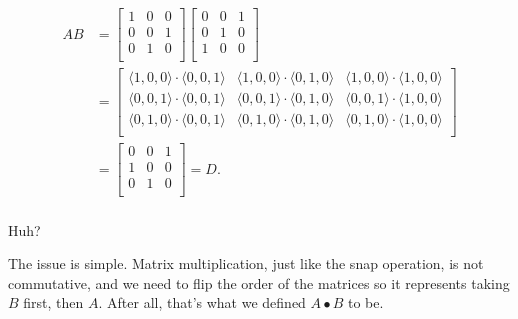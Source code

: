 \documentclass[../key.tex]{subfiles}
\begin{document}
\begin{align*}
AB &= \begin{bmatrix}
1 & 0 & 0 \\
0 & 0 & 1 \\
0 & 1 & 0 \\
\end{bmatrix}\begin{bmatrix}
0 & 0 & 1 \\
0 & 1 & 0 \\
1 & 0 & 0 \\
\end{bmatrix} \\
&= \begin{bmatrix}
\langle1,0,0\rangle \cdot \langle0,0,1\rangle & \langle1,0,0\rangle \cdot \langle0,1,0\rangle & \langle1,0,0\rangle \cdot \langle1,0,0\rangle \\
\langle0,0,1\rangle \cdot \langle0,0,1\rangle & \langle0,0,1\rangle \cdot \langle0,1,0\rangle & \langle0,0,1\rangle \cdot \langle1,0,0\rangle \\
\langle0,1,0\rangle \cdot \langle0,0,1\rangle & \langle0,1,0\rangle \cdot \langle0,1,0\rangle & \langle0,1,0\rangle \cdot \langle1,0,0\rangle \\
\end{bmatrix} \\
&= \begin{bmatrix}
0 & 0 & 1 \\
1 & 0 & 0 \\
0 & 1 & 0 \\
\end{bmatrix} = D. \\
\end{align*}

Huh?

The issue is simple. Matrix multiplication, just like the snap operation, is not commutative, and we need to flip the order of the matrices so it represents taking $B$ first, then $A$. After all, that's what we defined $A\bullet B$ to be.
\end{document}
